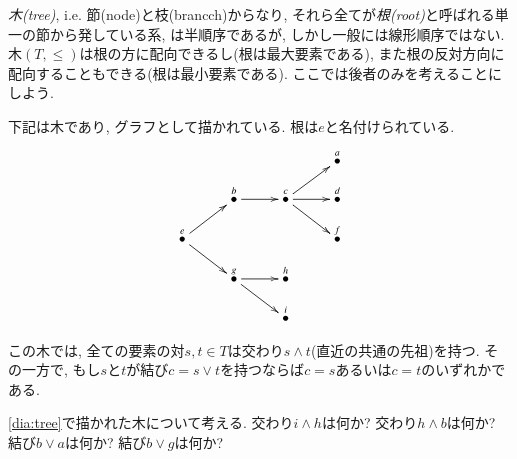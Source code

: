 \begin{example}[木]\label{ex:tree}


\emph{木(tree)}, i.e. 節(node)と枝(brancch)からなり, それら全てが\emph{根(root)}と呼ばれる単一の節から発している系, は半順序であるが, しかし一般には線形順序ではない. 木$(T,\leq)$は根の方に配向できるし(根は最大要素である), また根の反対方向に配向することもできる(根は最小要素である). ここでは後者のみを考えることにしよう.

下記は木であり, グラフとして描かれている. 根は$e$と名付けられている.
\begin{align}\label{dia:tree}
\xymatrix@=10pt{
&&&&&&\LMO{a}\\
&&\LMO{b}\ar[rr]&&\LMO{c}\ar[urr]\ar[rr]\ar[drr]&&\LMO{d}\\
\LMO{e}\ar[urr]\ar[drr]&&&&&&\LMO{f}\\
&&\LMO{g}\ar[rr]\ar[drr]&&\LMO{h}\\
&&&&\LMO{i}
}
\end{align}

この木では, 全ての要素の対$s, t\in T$は交わり$s\wedge t$(直近の共通の先祖)を持つ. その一方で, もし$s$と$t$が結び$c=s\vee t$を持つならば$c=s$あるいは$c=t$のいずれかである.

\end{example}

\begin{exercise}
\eqref{dia:tree}で描かれた木について考える.
\sexc 交わり$i\wedge h$は何か?
\next 交わり$h\wedge b$は何か?
\next 結び$b\vee a$は何か?
\next 結び$b\vee g$は何か?
\endsexc
\end{exercise}

